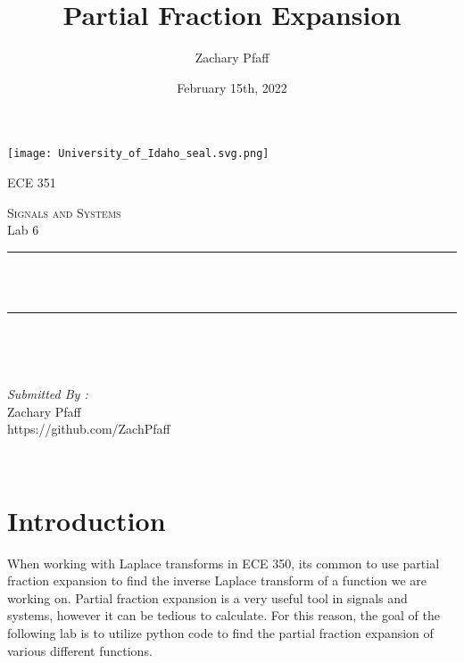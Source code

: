 \documentclass[12pt]{report}
\title{Partial Fraction Expansion}
\author{Zachary Pfaff}
\date{February 15th, 2022}
\makeatletter
\let\thetitle\@title
\makeatother
\begin{document}
\begin{titlepage}
\centering
\vspace*{0.5 cm}
\texttt{[image: University\_of\_Idaho\_seal.svg.png]}\\
\begin{center}    \textsc{\Large   ECE 351}\\[2.0 cm]
\end{center}%
\textsc{\Large Signals and Systems  }\\[0.5 cm] %
Lab 6
\rule{\linewidth}{0.2 mm} \\[0.4 cm]
{ \huge \bfseries \thetitle}\\
\rule{\linewidth}{0.2 mm} \\[1.5 cm]
\begin{minipage}{0.4\textwidth}
\begin{flushleft} \large
\end{flushleft}
\end{minipage}~
\begin{minipage}{0.4\textwidth}
\begin{flushright} \large
\emph{Submitted By :} \\
Zachary Pfaff\\https://github.com/ZachPfaff
\end{flushright}
\end{minipage}\\[2 cm]
\end{titlepage}
\tableofcontents
\pagebreak
\renewcommand{\thesection}{\arabic{section}}
\setlength{\parindent}{20pt}

\maketitle
\section{Introduction}
\hspace{\parindent}When working with Laplace transforms in ECE 350, its common to use partial fraction expansion to find the inverse Laplace transform of a function we are working on. Partial fraction expansion is a very useful tool in signals and systems, however it can be tedious to calculate. For this reason, the goal of the following lab is to utilize python code to find the partial fraction expansion of various different functions.
\end{document}
